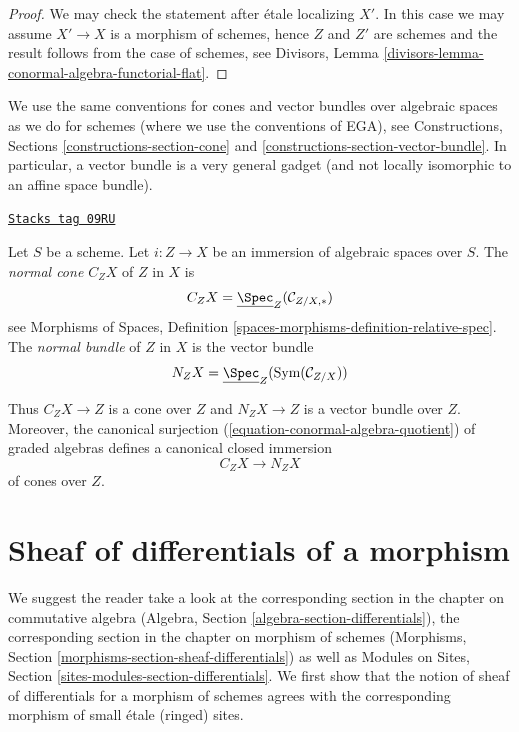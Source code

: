 \begin{proof}
We may check the statement after \'etale localizing $X'$.
In this case we may assume $X' \to X$ is a morphism of schemes,
hence $Z$ and $Z'$ are schemes and the result follows from
the case of schemes, see
Divisors, Lemma \ref{divisors-lemma-conormal-algebra-functorial-flat}.
\end{proof}

We use the same conventions for cones and vector bundles over
algebraic spaces as we do for schemes (where we use
the conventions of EGA), see
Constructions, Sections \ref{constructions-section-cone} and
\ref{constructions-section-vector-bundle}.
In particular, a vector bundle is a very general gadget
(and not locally isomorphic to an affine space bundle).

\begin{definition}
\label{spaces-more-morphisms-definition-normal-cone}
\href{https://stacks.math.columbia.edu/tag/09RU}{\texttt{Stacks tag 09RU}}

Let $S$ be a scheme. Let $i : Z \to X$ be an immersion of algebraic spaces
over $S$. The {\it normal cone $C_ZX$} of $Z$ in $X$ is
$$
C_ZX = \underline{\Spec}_Z(\mathcal{C}_{Z/X, *})
$$
see Morphisms of Spaces,
Definition \ref{spaces-morphisms-definition-relative-spec}. The
{\it normal bundle} of $Z$ in $X$ is the vector bundle
$$
N_ZX = \underline{\Spec}_Z(\text{Sym}(\mathcal{C}_{Z/X}))
$$
\end{definition}

Thus $C_ZX \to Z$ is a cone over $Z$ and $N_ZX \to Z$ is a vector bundle
over $Z$. Moreover, the canonical surjection
(\ref{equation-conormal-algebra-quotient}) of graded algebras
defines a canonical closed immersion
\begin{equation}
\label{equation-normal-cone-in-normal-bundle}
C_ZX \longrightarrow N_ZX
\end{equation}
of cones over $Z$.

\section{Sheaf of differentials of a morphism}
\label{spaces-more-morphisms-section-sheaf-differentials}
We suggest the reader take a look at the corresponding section
in the chapter on commutative algebra
(Algebra, Section \ref{algebra-section-differentials}),
the corresponding section in the chapter on morphism of schemes
(Morphisms, Section \ref{morphisms-section-sheaf-differentials})
as well as
Modules on Sites, Section \ref{sites-modules-section-differentials}.
We first show that the notion of sheaf of differentials for a
morphism of schemes agrees with the corresponding morphism of
small \'etale (ringed) sites.

